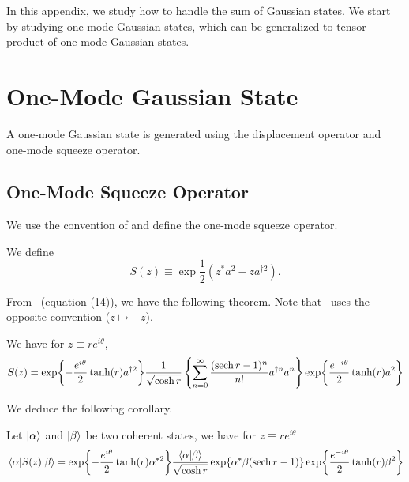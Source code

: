 In this appendix, we study how to handle the sum of Gaussian states. We start by studying one-mode Gaussian states, which can be generalized to tensor product of one-mode Gaussian states.

\section{One-Mode Gaussian State}
A one-mode Gaussian state is generated using the displacement operator and one-mode squeeze operator.
\subsection{One-Mode Squeeze Operator}
We use the convention of \cite{dynamiqs-squeeze, squeeze_normal_order} and define the one-mode squeeze operator.
\begin{definition}
    We define
    \begin{equation}
        S(z) \equiv \exp{\frac{1}{2}\left(z^* a^2 - z a^{\dagger 2}\right)}.
    \end{equation}
\end{definition}

From~\cite{squeeze_normal_order} (equation (14)), we have the following theorem. Note that~\cite{squeeze_normal_order} uses the opposite convention ($z\mapsto-z$).
\begin{theorem}
    We have for $z \equiv r e^{i \theta}$,
    \begin{equation}
        S(z) = \exp{-\frac{e^{i \theta}}{2} \tanh(r) a^{\dagger 2}} \frac{1}{\sqrt{\cosh{r}}} \left\{\sum_{n=0}^\infty \frac{(\sech{r} - 1)^n}{n!} a^{\dagger n} a^n\right\} \exp{\frac{e^{-i \theta}}{2} \tanh(r) a^2}
    \end{equation}
\end{theorem}

We deduce the following corollary.

\begin{corollary}
    Let $\ket{\alpha}$ and $\ket{\beta}$ be two coherent states, we have for $z \equiv r e^{i \theta}$
    \begin{equation}
        \mel{\alpha}{S(z)}{\beta} = \exp{-\frac{e^{i \theta}}{2} \tanh(r) \alpha^{* 2}} \frac{\braket{\alpha}{\beta}}{\sqrt{\cosh{r}}} \exp{\alpha^* \beta (\sech{r} - 1)} \exp{\frac{e^{-i \theta}}{2} \tanh(r) \beta^2}
    \end{equation}
\end{corollary}

